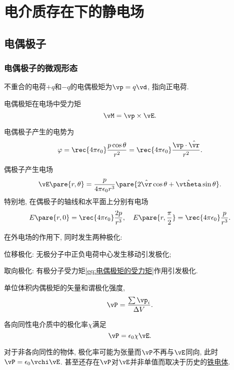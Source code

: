 \documentclass[../Electromagnetism.tex]{subfiles}
\begin{document}
\section{电介质存在下的静电场} %
\label{sec:电介质存在下的静电场}

\subsection{电偶极子} %
\label{sub:电偶极子}

\subsubsection{电偶极子的微观形态} %
\label{ssub:电偶极子的微观形态}

\begin{definition}[电偶极矩]
	不重合的电荷$+q$和$-q$的电偶极矩为$\vp = q\vd$, 指向正电荷.
\end{definition}
\begin{finale}
	\begin{corollary}[电偶极矩的受力矩]
		电偶极矩在电场中受力矩
		\begin{equation}
			\label{eq:电偶极矩的受力矩}
			\vM = \vp \times \vE.
		\end{equation}
	\end{corollary}
\end{finale}
电偶极子产生的电势为
\begin{equation}
	\label{eq:电偶极子产生的电势}
	\varphi = \rec{4\pi\epsilon_0}\frac{p\cos\theta}{r^2} = \rec{4\pi\epsilon_0}\frac{\vp\cdot\hat{\vr}}{r^2}.
\end{equation}
\begin{corollary}[偶极子产生的电场]
	偶极子产生电场
	\[ \vE\pare{r,\theta} = \frac{p}{4\pi\epsilon_0 r^3}\pare{2\hat{\vr}\cos\theta + \hat{\vtheta} \sin\theta}. \]
	特别地, 在偶极子的轴线和水平面上分别有电场
	\[ E\pare{r, 0} = \rec{4\pi\epsilon_0}\frac{2p}{r^3},\quad E\pare{r, \frac{\pi}{2}} = \rec{4\pi\epsilon_0}\frac{p}{r^3}. \]
\end{corollary}
在外电场的作用下, 同时发生两种极化:
\begin{cenum}
	\item 位移极化: 无极分子中正负电荷中心发生移动引发极化;
	\item 取向极化: 有极分子受力矩\eqref{eq:电偶极矩的受力矩}作用引发极化.
\end{cenum}
\begin{definition}[极化强度]
	单位体积内偶极矩的矢量和谓极化强度,
	\[ \vP = \frac{\sum \vp_i}{\Delta V}. \]
\end{definition}
\begin{definition}[极化率]
	各向同性电介质中的极化率$\chi$满足
	\begin{equation}
		\label{eq:极化率定义}
	 	\vP = \epsilon_0 \chi \vE.
	 \end{equation}
\end{definition}
\begin{remark}
	对于非各向同性的物体, 极化率可能为张量而$\vP$不再与$\vE$同向, 此时$\vP = \epsilon_0 \vchi \vE$. 甚至还存在$\vP$对$\vE$并非单值而取决于历史的\href{https://zh.wikipedia.org/wiki/%E9%93%81%E7%94%B5%E6%80%A7}{铁电体}.
\end{remark}
\end{document}

